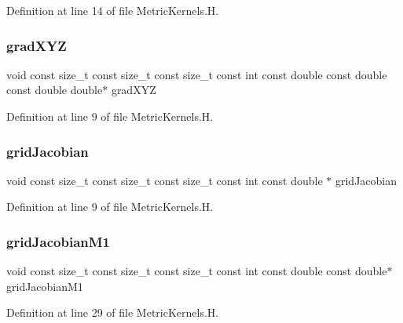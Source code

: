 Definition at line 14 of file Metric\+Kernels.\+H.

\hypertarget{MetricKernels_8H_a88d2da27b44f006b58b7cebd40406d58}{}\label{MetricKernels_8H_a88d2da27b44f006b58b7cebd40406d58} 
\subsubsection{\texorpdfstring{grad\+X\+YZ}{gradXYZ}}
{\footnotesize\ttfamily void const size\+\_\+t const size\+\_\+t const size\+\_\+t const int const double const double const double double$\ast$ grad\+X\+YZ}



Definition at line 9 of file Metric\+Kernels.\+H.

\hypertarget{MetricKernels_8H_a3a6e775161b1fcb46948572207773765}{}\label{MetricKernels_8H_a3a6e775161b1fcb46948572207773765} 
\subsubsection{\texorpdfstring{grid\+Jacobian}{gridJacobian}}
{\footnotesize\ttfamily void const size\+\_\+t const size\+\_\+t const size\+\_\+t const int const double $\ast$ grid\+Jacobian}



Definition at line 9 of file Metric\+Kernels.\+H.

\hypertarget{MetricKernels_8H_a5c19d28b66b8a4b678ae9cff6a54aa47}{}\label{MetricKernels_8H_a5c19d28b66b8a4b678ae9cff6a54aa47} 
\subsubsection{\texorpdfstring{grid\+Jacobian\+M1}{gridJacobianM1}}
{\footnotesize\ttfamily void const size\+\_\+t const size\+\_\+t const size\+\_\+t const int const double const double$\ast$ grid\+Jacobian\+M1}



Definition at line 29 of file Metric\+Kernels.\+H.

\hypertarget{MetricKernels_8H_a1bb228c762eec1a00302214e00b38fdc}{}\label{MetricKernels_8H_a1bb228c762eec1a00302214e00b38fdc} 

